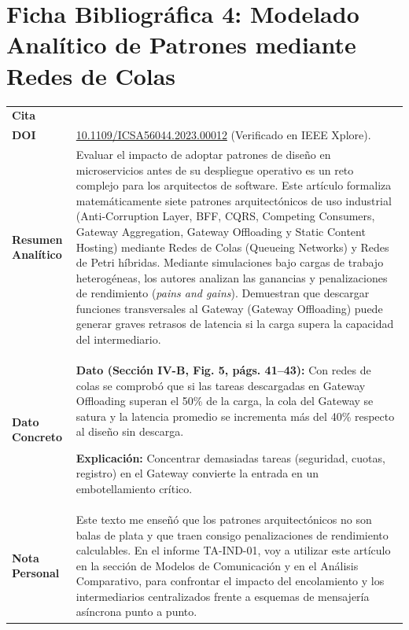 \documentclass[11pt,a4paper]{article}
\begin{document}
\newpage

\section{Ficha Bibliográfica 4: Modelado Analítico de Patrones mediante Redes de Colas}

\noindent
\renewcommand{\arraystretch}{1.2}
\begin{tabularx}{\textwidth}{|>{\raggedright\arraybackslash}p{3.2cm}|X|}
\hline
\multicolumn{2}{|c|}{\bfseries FICHA DE LECTURA N.° 4: MODELADO CON REDES DE COLAS} \\
\hline
\textbf{Cita} & \parbox{\dimexpr\linewidth-6pt\relax}{\raggedright\vspace{2pt}\vspace{2pt}} \\
\hline
\textbf{DOI} & \href{https://doi.org/10.1109/ICSA56044.2023.00012}{10.1109/ICSA56044.2023.00012} (Verificado en IEEE Xplore). \\
\hline
\textbf{Resumen Analítico} & Evaluar el impacto de adoptar patrones de diseño en microservicios antes de su despliegue operativo es un reto complejo para los arquitectos de software. Este artículo formaliza matemáticamente siete patrones arquitectónicos de uso industrial (Anti-Corruption Layer, BFF, CQRS, Competing Consumers, Gateway Aggregation, Gateway Offloading y Static Content Hosting) mediante Redes de Colas (Queueing Networks) y Redes de Petri híbridas. Mediante simulaciones bajo cargas de trabajo heterogéneas, los autores analizan las ganancias y penalizaciones de rendimiento (\emph{pains and gains}). Demuestran que descargar funciones transversales al Gateway (Gateway Offloading) puede generar graves retrasos de latencia si la carga supera la capacidad del intermediario. \\
\hline
\textbf{Dato Concreto} & \textbf{Dato (Sección IV-B, Fig. 5, págs. 41--43):} Con redes de colas se comprobó que si las tareas descargadas en Gateway Offloading superan el 50\% de la carga, la cola del Gateway se satura y la latencia promedio se incrementa más del 40\% respecto al diseño sin descarga. \par\vspace{0.2em}
\textbf{Explicación:} Concentrar demasiadas tareas (seguridad, cuotas, registro) en el Gateway convierte la entrada en un embotellamiento crítico. \\
\hline
\textbf{Nota Personal} & Este texto me enseñó que los patrones arquitectónicos no son balas de plata y que traen consigo penalizaciones de rendimiento calculables. En el informe TA-IND-01, voy a utilizar este artículo en la sección de Modelos de Comunicación y en el Análisis Comparativo, para confrontar el impacto del encolamiento y los intermediarios centralizados frente a esquemas de mensajería asíncrona punto a punto. \\
\hline
\end{tabularx}
\end{document}
